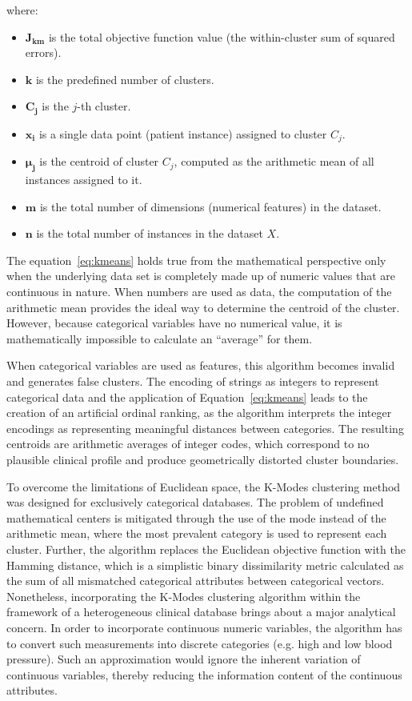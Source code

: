 where:
\begin{itemize}
    \item $\boldsymbol{J_{km}}$ is the total objective function value (the within-cluster sum of squared errors).
    \item $\boldsymbol{k}$ is the predefined number of clusters.
    \item $\boldsymbol{C_j}$ is the $j$-th cluster.
    \item $\boldsymbol{x_i}$ is a single data point (patient instance) assigned to cluster $C_j$.
    \item $\boldsymbol{\mu_j}$ is the centroid of cluster $C_j$, computed as the arithmetic mean of all instances assigned to it.
    \item $\boldsymbol{m}$ is the total number of dimensions (numerical features) in the dataset.
    \item $\boldsymbol{n}$ is the total number of instances in the dataset $X$.
\end{itemize}

\vspace{1em}

The equation~\eqref{eq:kmeans} holds true from the mathematical perspective only when the underlying data set is completely made up of numeric values that are continuous in nature. When numbers are used as data, the computation of the arithmetic mean provides the ideal way to determine the centroid of the cluster. However, because categorical variables have no numerical value, it is mathematically impossible to calculate an ``average'' for them.

When categorical variables are used as features, this algorithm becomes invalid and generates false clusters. The encoding of strings as integers to represent categorical data and the application of Equation~\eqref{eq:kmeans} leads to the creation of an artificial ordinal ranking, as the algorithm interprets the integer encodings as representing meaningful distances between categories. The resulting centroids are arithmetic averages of integer codes, which correspond to no plausible clinical profile and produce geometrically distorted cluster boundaries.

To overcome the limitations of Euclidean space, the K-Modes clustering method was designed for exclusively categorical databases. The problem of undefined mathematical centers is mitigated through the use of the mode instead of the arithmetic mean, where the most prevalent category is used to represent each cluster. Further, the algorithm replaces the Euclidean objective function with the Hamming distance, which is a simplistic binary dissimilarity metric calculated as the sum of all mismatched categorical attributes between categorical vectors. Nonetheless, incorporating the K-Modes clustering algorithm within the framework of a heterogeneous clinical database brings about a major analytical concern. In order to incorporate continuous numeric variables, the algorithm has to convert such measurements into discrete categories (e.g. high and low blood pressure). Such an approximation would ignore the inherent variation of continuous variables, thereby reducing the information content of the continuous attributes.

